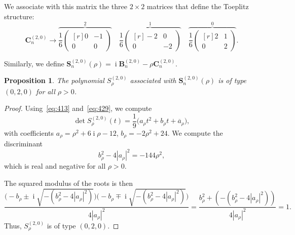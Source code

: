\documentclass[addpoints,12pt,letter]{article}
\DeclareMathOperator{\mi}{i} %
\newcommand{\ol}{\overline}
\newcommand{\SR}{S}
\numberwithin{equation}{section}
\newtheorem{proposition}[lemma]{Proposition}
\theoremstyle{definition}
\begin{document}
We associate with this matrix the three $2\times 2$ matrices that define the Toeplitz structure:
\begin{equation}\label{eq:429}
\mathbf{C}_{n}^{(2,0)}\to
\overbrace{\frac{1}{6}\begin{pmatrix}[r]
0 &-1 \\
0 & 0
\end{pmatrix}}^{2}
\quad
\overbrace{\frac{1}{6}\begin{pmatrix}[r]
-2 & 0 \\
0 &-2
\end{pmatrix}}^{1}
\quad
\overbrace{\frac{1}{6}\begin{pmatrix}[r]
2 & 1 \\
0 & 2
\end{pmatrix}}^{0}.
\end{equation}

Similarly, we define $\mathbf{S}_{n}^{(2,0)}(\rho)=\mi\mathbf{B}_{n}^{(2,0)}-\rho\mathbf{C}_{n}^{(2,0)}$.

\begin{proposition}\label{P56}
The polynomial $\SR_{\rho}^{(2,0)}$ associated with $\mathbf{S}_{n}^{(2,0)}(\rho)$ is of type $(0,2,0)$ for all $\rho>0$.
\end{proposition}

\begin{proof}
Using~\eqref{eq:413} and~\eqref{eq:429}, we compute
\[
\det \SR_{\rho}^{(2,0)}(t)=\frac{1}{9}\big(a_{\rho} t^{2}+b_{\rho} t+\ol{a}_{\rho}\big),
\]
with coefficients $a_{\rho}=\rho^{2}+6\mi\rho-12$, $b_{\rho}=-2\rho^{2}+24$.
We compute the discriminant
\[
b_{\rho}^{2}-4|a_{\rho}|^{2}=-144\rho^{2},
\]
which is real and negative for all $\rho>0$.

The squared modulus of the roots is then
\[
\frac{\Big(-b_{\rho}\pm\mi\sqrt{-(b_{\rho}^{2}-4|a_{\rho}|^{2})}\Big)\Big(-b_{\rho}\mp\mi\sqrt{-(b_{\rho}^{2}-4|a_{\rho}|^{2})}\Big)}{4|a_{\rho}|^{2}}
=\frac{b_{\rho}^{2}+(-(b_{\rho}^{2}-4|a_{\rho}|^{2}))}{4|a_{\rho}|^{2}}=1.
\]
Thus, $\SR_{\rho}^{(2,0)}$ is of type $(0,2,0)$.
\end{proof}
\end{document}
